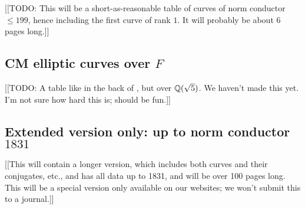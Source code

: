 \documentclass{amsart}
\begin{document}
[[TODO: This will be a short-as-reasonable table of curves of norm
conductor $\leq 199$, hence including the first curve of rank $1$.  It
will probably be about 6 pages long.]]

\subsection{CM elliptic curves over $F$}\label{sec:cm}

[[TODO: A table like in the back of \cite{silverman:aec2}, but over
$\mathbb{Q}(\sqrt{5})$.  We haven't made this yet.  I'm not sure how hard this
is; should be fun.]]

\subsection{Extended version only: up to norm conductor  $1831$}\label{sec:to1831}

[[This will contain a longer version, which includes both curves and
their conjugates, etc., and has all data up to 1831, and will be over
100 pages long.  This will be a special version only available on our
websites; we won't submit this to a journal.]]



 

\end{document}
